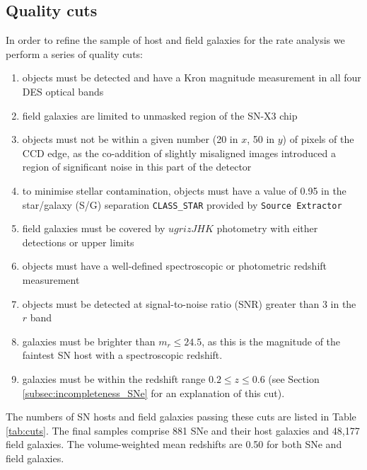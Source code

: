 \documentclass[fleqn,usenatbib]{mnras}
\begin{document}
\subsection{Quality cuts \label{subsec:cuts}}

In order to refine the sample of host and field galaxies for the rate analysis we perform a series of quality cuts:

\begin{enumerate}
    \item objects must be detected and have a Kron magnitude measurement in all four DES optical bands
    
    \item field galaxies are limited to unmasked region of the SN-X3 chip \citep{Hartley2020}
    
    \item objects must not be within a given number (20 in $x$, 50 in $y$) of pixels of the CCD edge, as the co-addition of slightly misaligned images introduced a region of significant noise in this part of the detector
    
    \item to minimise stellar contamination, objects must have a value of 0.95 in the star/galaxy (S/G) separation \texttt{CLASS\_STAR} provided by \texttt{Source Extractor} \citep{Bertin1996}
    
    \item field galaxies must be covered by $ugrizJHK$ photometry with either detections or upper limits
    
    \item objects must have a well-defined spectroscopic or photometric redshift measurement
    
    \item objects must be detected at signal-to-noise ratio (SNR) greater than 3 in the $r$ band
    
    \item galaxies must be brighter than $m_r \leq 24.5$, as this is the magnitude of the faintest SN host with a spectroscopic redshift.
    
    \item galaxies must be within the redshift range $0.2 \leq z \leq 0.6$ (see Section \ref{subsec:incompleteness_SNe} for an explanation of this cut).
\end{enumerate}

The numbers of SN hosts and field galaxies passing these cuts are listed in Table \ref{tab:cuts}. The final samples comprise 881 SNe and their host galaxies and 48,177 field galaxies. The volume-weighted mean redshifts are 0.50 for both SNe and field galaxies.
\end{document}
